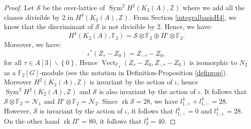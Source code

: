 \documentclass{alggeom}
\DeclareMathOperator{\id}{id}
\DeclareMathOperator{\Sym}{Sym}
\DeclareMathOperator{\rk}{rk}
\DeclareMathOperator{\Vect}{Vect}
\newcommand{\Q}{\mathbb{Q}}
\newcommand{\Z}{\mathbb{Z}}
\newcommand{\F}{\mathbb{F}_{2}}
\theoremstyle{plain}
\theoremstyle{definition}
\theoremstyle{remark}
\begin{document}
\begin{proof}

Let $\mathcal{S}$ be the over-lattice of $\Sym^{2} H^{2}(K_{2}(A),\Z)$ where we add all the classes divisible by 2 in $H^{4}(K_{2}(A),\Z)$.
From Section \ref{integralbasisH4}, we know that the discriminant of $\mathcal{S}$ is not divisible by 2.
Hence, we have:
$$H^{4}(K_{2}(A),\F)=\mathcal{S}\otimes\F\oplus \Pi'\otimes\F.$$
Moreover, we have: $$\iota^{*}(Z_{\tau}-Z_{0})=Z_{-\tau}-Z_{0},$$
for all $\tau\in A[3]\smallsetminus \left\{0\right\}$.
Hence $\Vect_{\F}(Z_{\tau}-Z_{0},Z_{-\tau}-Z_{0})$ is isomorphic to $N_{2}$ as a $\F[G]$-module  (see the notation in Definition-Proposition \ref{defiprop}).
Moreover $H^{2}(K_{2}(A),\Z)$ is invariant by the action of $\iota$, hence $\Sym^{2} H^{2}(K_{2}(A),\Z)$ and $\mathcal{S}$ is also invariant by the action of $\iota$. 
It follows that $\mathcal{S}\otimes\F=\mathcal{N}_{1}$ and $\Pi'\otimes\F=\mathcal{N}_{2}$.
Since $\rk \mathcal{S}=28$, we have $l_{1,+}^{4}+l_{1,-}^{4}=28$.
However, $\mathcal{S}$ is invariant by the action of $\iota$, it follows that $l_{1,-}^{4}=0$ and $l_{1,+}^{4}=28$.
On the other hand $\rk \Pi'=80$, it follows that $l_{2}^{4}=40$.
\end{proof}
\end{document}
